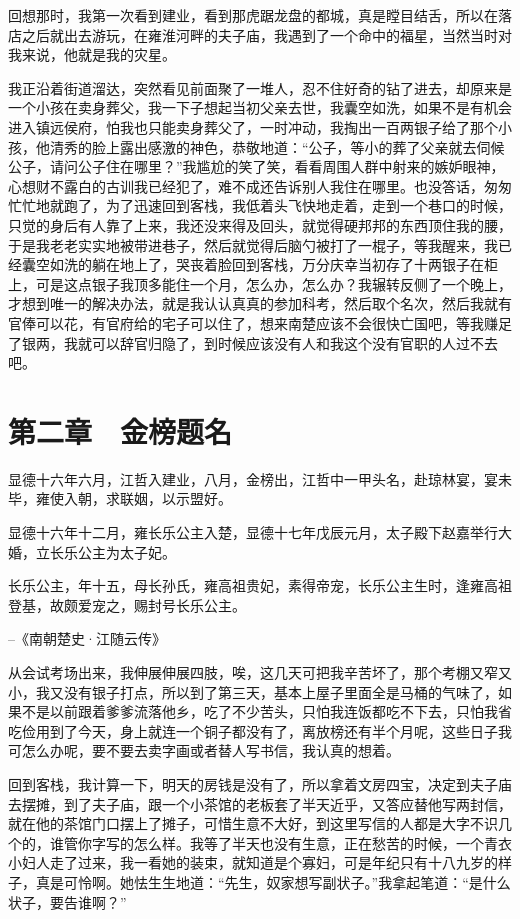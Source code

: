 回想那时，我第一次看到建业，看到那虎踞龙盘的都城，真是瞠目结舌，所以在落店之后就出去游玩，在雍淮河畔的夫子庙，我遇到了一个命中的福星，当然当时对我来说，他就是我的灾星。

我正沿着街道溜达，突然看见前面聚了一堆人，忍不住好奇的钻了进去，却原来是一个小孩在卖身葬父，我一下子想起当初父亲去世，我囊空如洗，如果不是有机会进入镇远侯府，怕我也只能卖身葬父了，一时冲动，我掏出一百两银子给了那个小孩，他清秀的脸上露出感激的神色，恭敬地道：“公子，等小的葬了父亲就去伺候公子，请问公子住在哪里？”我尴尬的笑了笑，看看周围人群中射来的嫉妒眼神，心想财不露白的古训我已经犯了，难不成还告诉别人我住在哪里。也没答话，匆匆忙忙地就跑了，为了迅速回到客栈，我低着头飞快地走着，走到一个巷口的时候，只觉的身后有人靠了上来，我还没来得及回头，就觉得硬邦邦的东西顶住我的腰，于是我老老实实地被带进巷子，然后就觉得后脑勺被打了一棍子，等我醒来，我已经囊空如洗的躺在地上了，哭丧着脸回到客栈，万分庆幸当初存了十两银子在柜上，可是这点银子我顶多能住一个月，怎么办，怎么办？我辗转反侧了一个晚上，才想到唯一的解决办法，就是我认认真真的参加科考，然后取个名次，然后我就有官俸可以花，有官府给的宅子可以住了，想来南楚应该不会很快亡国吧，等我赚足了银两，我就可以辞官归隐了，到时候应该没有人和我这个没有官职的人过不去吧。

\chapter{第二章　金榜题名}

显德十六年六月，江哲入建业，八月，金榜出，江哲中一甲头名，赴琼林宴，宴未毕，雍使入朝，求联姻，以示盟好。

显德十六年十二月，雍长乐公主入楚，显德十七年戊辰元月，太子殿下赵嘉举行大婚，立长乐公主为太子妃。

长乐公主，年十五，母长孙氏，雍高祖贵妃，素得帝宠，长乐公主生时，逢雍高祖登基，故颇爱宠之，赐封号长乐公主。

--《南朝楚史·江随云传》

从会试考场出来，我伸展伸展四肢，唉，这几天可把我辛苦坏了，那个考棚又窄又小，我又没有银子打点，所以到了第三天，基本上屋子里面全是马桶的气味了，如果不是以前跟着爹爹流落他乡，吃了不少苦头，只怕我连饭都吃不下去，只怕我省吃俭用到了今天，身上就连一个铜子都没有了，离放榜还有半个月呢，这些日子我可怎么办呢，要不要去卖字画或者替人写书信，我认真的想着。

回到客栈，我计算一下，明天的房钱是没有了，所以拿着文房四宝，决定到夫子庙去摆摊，到了夫子庙，跟一个小茶馆的老板套了半天近乎，又答应替他写两封信，就在他的茶馆门口摆上了摊子，可惜生意不大好，到这里写信的人都是大字不识几个的，谁管你字写的怎么样。我等了半天也没有生意，正在愁苦的时候，一个青衣小妇人走了过来，我一看她的装束，就知道是个寡妇，可是年纪只有十八九岁的样子，真是可怜啊。她怯生生地道：“先生，奴家想写副状子。”我拿起笔道：“是什么状子，要告谁啊？”

